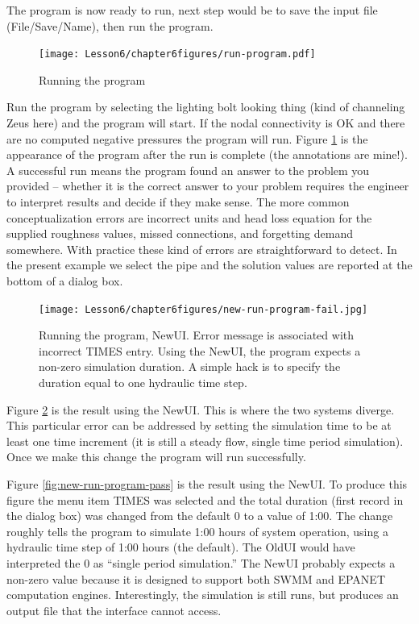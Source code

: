 The program is now ready to run, next step would be to save the input file (File/Save/Name), then run the program.  

\begin{figure}[h!] %
   \centering
   \texttt{[image: Lesson6/chapter6figures/run-program.pdf]} 
   \caption{Running the program}
   \label{fig:run-program}
\end{figure}
Run the program by selecting the lighting bolt looking thing (kind of channeling Zeus here) and the program will start.  If the nodal connectivity is OK and there are no computed negative pressures the program will run.   Figure \ref{fig:run-program}  is the appearance of the program after the run is complete (the annotations are mine!).
A successful run means the program found an answer to the problem you provided -- whether it is the correct answer to your problem requires the engineer to interpret results and decide if they make sense.  The more common conceptualization errors are incorrect units and head loss equation for the supplied roughness values, missed connections, and forgetting demand somewhere.  With practice these kind of errors are straightforward to detect.   In the present example we select the pipe and the solution values are reported at the bottom of a dialog box.

\begin{figure}[h!] %
   \centering
   \texttt{[image: Lesson6/chapter6figures/new-run-program-fail.jpg]} 
   \caption{Running the program, NewUI.  Error message is associated with incorrect TIMES entry.  Using the NewUI, the program expects a non-zero simulation duration.   A simple hack is to specify the duration equal to one hydraulic time step.}
   \label{fig:new-run-program-fail}
\end{figure}

Figure \ref{fig:new-run-program-fail} is the result using the NewUI.  
This is where the two systems diverge.
This particular error can be addressed by setting the simulation time to be at least one time increment (it is still a steady flow, single time period simulation).
Once we make this change the program will run successfully.

Figure \ref{fig:new-run-program-pass} is the result using the NewUI.  
To produce this figure the menu item TIMES was selected and the total duration (first record in the dialog box) was changed from the default 0 to a value of 1:00.
The change roughly tells the program to simulate 1:00 hours of system operation, using a hydraulic time step of 1:00 hours (the default).
The OldUI would have interpreted the 0 as ``single period simulation.''
The NewUI probably expects a non-zero value because it is designed to support both SWMM and EPANET computation engines.
Interestingly, the simulation is still runs, but produces an output file that the interface cannot access.

